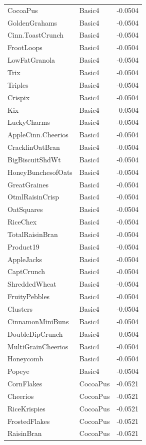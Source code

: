 \begin{table}[!htbp]
\begin{tabular}{lll}
\\
CocoaPus & Basic4 & -0.0504
\\
GoldenGrahams & Basic4 & -0.0504
\\
Cinn.ToastCrunch & Basic4 & -0.0504
\\
FrootLoops & Basic4 & -0.0504
\\
LowFatGranola & Basic4 & -0.0504
\\
Trix & Basic4 & -0.0504
\\
Triples & Basic4 & -0.0504
\\
Crispix & Basic4 & -0.0504
\\
Kix & Basic4 & -0.0504
\\
LuckyCharms & Basic4 & -0.0504
\\
AppleCinn.Cheerios & Basic4 & -0.0504
\\
CracklinOatBran & Basic4 & -0.0504
\\
BigBiscuitShdWt & Basic4 & -0.0504
\\
HoneyBunchesofOats & Basic4 & -0.0504
\\
GreatGraines & Basic4 & -0.0504
\\
OtmlRaisinCrisp & Basic4 & -0.0504
\\
OatSquares & Basic4 & -0.0504
\\
RiceChex & Basic4 & -0.0504
\\
TotalRaisinBran & Basic4 & -0.0504
\\
Product19 & Basic4 & -0.0504
\\
AppleJacks & Basic4 & -0.0504
\\
CaptCrunch & Basic4 & -0.0504
\\
ShreddedWheat & Basic4 & -0.0504
\\
FruityPebbles & Basic4 & -0.0504
\\
Clusters & Basic4 & -0.0504
\\
CinnamonMiniBuns & Basic4 & -0.0504
\\
DoubleDipCrunch & Basic4 & -0.0504
\\
MultiGrainCheerios & Basic4 & -0.0504
\\
Honeycomb & Basic4 & -0.0504
\\
Popeye & Basic4 & -0.0504
\\
CornFlakes & CocoaPus & -0.0521
\\
Cheerios & CocoaPus & -0.0521
\\
RiceKrispies & CocoaPus & -0.0521
\\
FrostedFlakes & CocoaPus & -0.0521
\\
RaisinBran & CocoaPus & -0.0521

\end{tabular}
\end{table}
